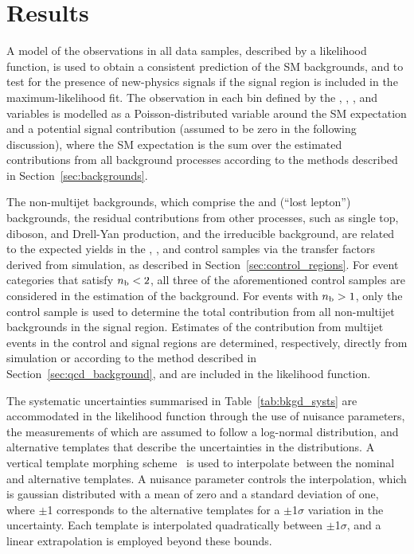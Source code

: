 \section{Results}
\label{sec:result}

A model of the observations in all data samples, described by a
likelihood function, is used to obtain a consistent prediction of the
SM backgrounds, and to test for the presence of new-physics signals if
the signal region is included in the maximum-likelihood fit. The
observation in each bin defined by the \njet, \nb, \scalht, and \HTmiss
variables is modelled as a Poisson-distributed variable around the SM
expectation and a potential signal contribution (assumed to be zero in
the following discussion), where the SM expectation is the sum over
the estimated contributions from all background processes according to
the methods described in Section~\ref{sec:backgrounds}.

The non-multijet backgrounds, which comprise the \wlj and \ttj (``lost
lepton'') backgrounds, the residual contributions from other
processes, such as single top, diboson, and Drell-Yan production, and
the irreducible \znunuj background, are related to the expected yields
in the \mj, \mmj, and \gj control samples via the transfer factors
derived from simulation, as described in
Section~\ref{sec:control_regions}. For event categories that satisfy
$n_{\text{b}} < 2$, all three of the aforementioned control samples are
considered in the estimation of the \znunuj background. For events
with $n_{\text{b}} > 1$, only the \mj control sample is used to determine the
total contribution from all non-multijet backgrounds in the signal
region.  Estimates of the contribution from multijet events in the
control and signal regions are determined, respectively, directly from
simulation or according to the method described in
Section~\ref{sec:qcd_background}, and are included in the likelihood
function.


The systematic uncertainties summarised in Table~\ref{tab:bkgd_systs}
are accommodated in the likelihood function through the use of
nuisance parameters, the measurements of which are assumed to follow a
log-normal distribution, and alternative templates that describe the
uncertainties in the \HTmiss distributions. A vertical template
morphing scheme~\cite{Prosper:1306523} is used to interpolate between
the nominal and alternative \HTmiss templates. A nuisance parameter
controls the interpolation, which is gaussian distributed with a mean
of zero and a standard deviation of one, where $\pm$1 corresponds to
the alternative templates for a $\pm$1$\sigma$ variation in the
uncertainty. Each template is interpolated quadratically between
$\pm$1$\sigma$, and a linear extrapolation is employed beyond these
bounds.

